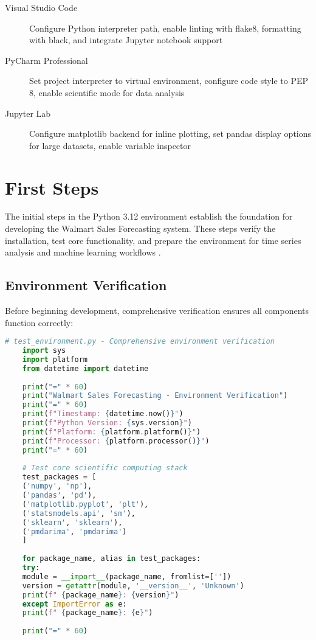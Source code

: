 \begin{description}
	\item[Visual Studio Code] Configure Python interpreter path, enable linting with flake8, formatting with black, and integrate Jupyter notebook support
	\item[PyCharm Professional] Set project interpreter to virtual environment, configure code style to PEP 8, enable scientific mode for data analysis
	\item[Jupyter Lab] Configure matplotlib backend for inline plotting, set pandas display options for large datasets, enable variable inspector
\end{description}

\section{First Steps}

The initial steps in the Python 3.12 environment establish the foundation for developing the Walmart Sales Forecasting system. These steps verify the installation, test core functionality, and prepare the environment for time series analysis and machine learning workflows \cite{Box:2016}.

\subsection{Environment Verification}

Before beginning development, comprehensive verification ensures all components function correctly:

\begin{lstlisting}[language=python]
	# test_environment.py - Comprehensive environment verification
	import sys
	import platform
	from datetime import datetime
	
	print("=" * 60)
	print("Walmart Sales Forecasting - Environment Verification")
	print("=" * 60)
	print(f"Timestamp: {datetime.now()}")
	print(f"Python Version: {sys.version}")
	print(f"Platform: {platform.platform()}")
	print(f"Processor: {platform.processor()}")
	print("=" * 60)
	
	# Test core scientific computing stack
	test_packages = [
	('numpy', 'np'),
	('pandas', 'pd'), 
	('matplotlib.pyplot', 'plt'),
	('statsmodels.api', 'sm'),
	('sklearn', 'sklearn'),
	('pmdarima', 'pmdarima')
	]
	
	for package_name, alias in test_packages:
	try:
	module = __import__(package_name, fromlist=[''])
	version = getattr(module, '__version__', 'Unknown')
	print(f" {package_name}: {version}")
	except ImportError as e:
	print(f" {package_name}: {e}")
	
	print("=" * 60)
\end{lstlisting}

